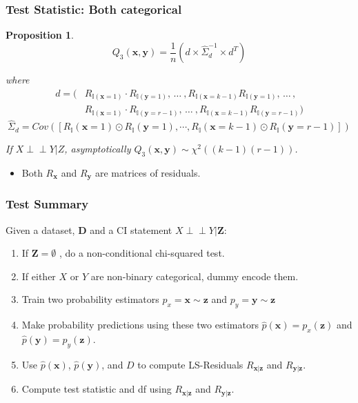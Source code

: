 \documentclass{beamer}
\def\ci{\perp\!\!\!\!\!\perp}
\newtheorem{proposition}{Proposition}
\begin{document}
\begin{frame}
	\frametitle{Test Statistic: Both categorical}
	\begin{proposition}

	$$ Q_3(\bm{x}, \bm{y}) = \frac{1}{n} (d \times \hat{\Sigma}_d^{-1} \times d^T) $$

	where
	\begin{equation*}
		\begin{split}
		d = (&R_{\mathbb{I}(\mathbf{x}=1)} \cdot R_{\mathbb{I}(\mathbf{y}=1)}, \, \ldots \ ,
				R_{\mathbb{I}(\mathbf{x}=k-1)} R_{\mathbb{I}(\mathbf{y}=1)}, \, \ldots \, , \\
		     &R_{\mathbb{I}(\mathbf{x}=1)} \cdot R_{\mathbb{I}(\mathbf{y}=r-1)}, \, \ldots \ ,
				R_{\mathbb{I}(\mathbf{x}=k-1)} R_{\mathbb{I}(\mathbf{y}=r-1)}) 
		\end{split}
	\end{equation*}
	\begin{equation*}
		\hat{\Sigma}_d = Cov([R_\mathbb{I}(\mathbf{x}=1) \odot R_\mathbb{I}(\mathbf{y}=1), \cdots, R_\mathbb{I}(\mathbf{x}=k-1) \odot R_\mathbb{I}(\mathbf{y}=r-1)])
	\end{equation*}

	If $ X \ci Y | Z $, asymptotically $ Q_3(\bm{x}, \bm{y}) \sim \chi^2((k-1)(r-1)) $.
	\end{proposition}
	\begin{center}
		\begin{itemize}
			\item Both $ R_{\bm{x}} $ and $ R_{\bm{y}} $ are matrices of residuals.
		\end{itemize}
	\end{center}

\end{frame}

\begin{frame}
	\frametitle{Test Summary}
	Given a dataset, $ \mathbf{D} $ and a CI statement $ X \ci Y | \bm{Z} $:
	\begin{enumerate}
		\setlength\itemsep{1em}
		\item If $\mathbf{Z} = \emptyset $ , do a non-conditional chi-squared test.
		\item If either $ X $ or $ Y $ are non-binary categorical,
			dummy encode them.
		\item Train two probability estimators $ p_x = \bm{x} \sim \bm{z} $ and
			$ p_y = \bm{y} \sim \bm{z} $
		\item Make probability predictions using these two estimators 
			$ \hat{p}(\bm{x}) = p_x(\bm{z}) $ and $ \hat{p}(\bm{y}) = p_y(\bm{\bm{z}}) $.
		\item Use $ \hat{p}(\bm{x}) $, $ \hat{p}(\bm{y}) $, and $ D $ to compute LS-Residuals $ R_{\bm{x}|\bm{z}} $ and $ R_{\bm{y}|\bm{z}} $.	
		\item Compute test statistic and df using $ R_{\bm{x}|\bm{z}} $ and $ R_{\bm{y}|\bm{z}} $.
	\end{enumerate}
\end{frame}
\end{document}
